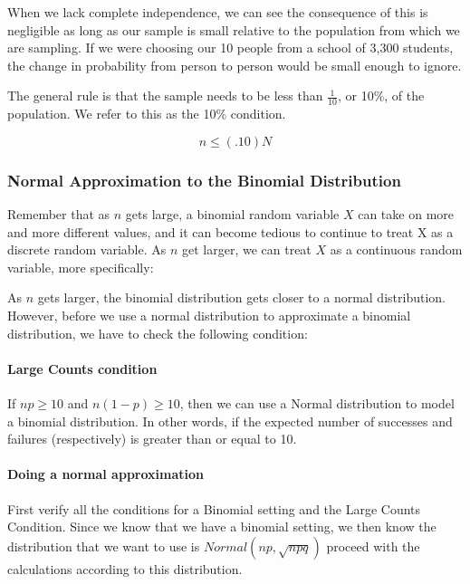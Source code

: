 \documentclass[
]{book}
\begin{document}
When we lack complete independence, we can see the consequence of this
is negligible as long as our sample is small relative to the population
from which we are sampling. If we were choosing our 10 people from a
school of 3,300 students, the change in probability from person to
person would be small enough to ignore.

The general rule is that the sample needs to be less than
\(\frac{1}{10}\), or 10\%, of the population. We refer to this as the 10\%
condition.

\[n \leq (.10) N\]

\hypertarget{normal-approximation-to-the-binomial-distribution}{%
\subsubsection{Normal Approximation to the Binomial Distribution}\label{normal-approximation-to-the-binomial-distribution}}

Remember that as \(n\) gets large, a binomial random variable \(X\) can take
on more and more different values, and it can become tedious to continue
to treat X as a discrete random variable. As \(n\) get larger, we can
treat \(X\) as a continuous random variable, more specifically:

As \(n\) gets larger, the binomial distribution gets closer to a normal
distribution. However, before we use a normal distribution to
approximate a binomial distribution, we have to check the following
condition:

\hypertarget{large-counts-condition}{%
\paragraph{Large Counts condition}\label{large-counts-condition}}

If \(np \geq 10\) and \(n(1-p) \geq 10\), then we can use a Normal
distribution to model a binomial distribution. In other words, if the
expected number of successes and failures (respectively) is greater than
or equal to 10.

\hypertarget{doing-a-normal-approximation}{%
\paragraph{Doing a normal approximation}\label{doing-a-normal-approximation}}

First verify all the conditions for a Binomial setting and the Large
Counts Condition. Since we know that we have a binomial setting, we then
know the distribution that we want to use is \(Normal(np, \sqrt{npq})\) proceed with the calculations according to this distribution.
\end{document}
